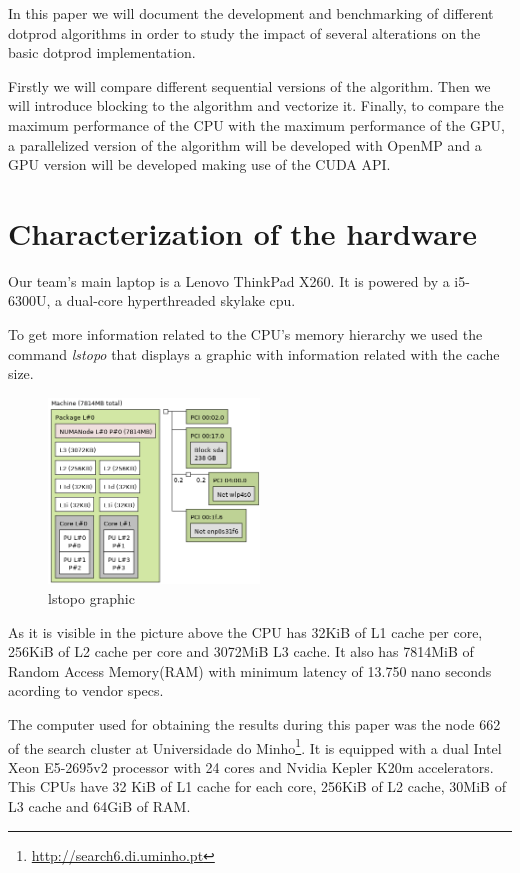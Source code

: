 \documentclass[a4paper]{report}
\begin{document}
In this paper we will document the development and benchmarking of different
dotprod algorithms in order to study the impact of several alterations on the
basic dotprod implementation.

Firstly we will compare different sequential versions of the algorithm. Then we
will introduce blocking to the algorithm and vectorize it. Finally, to compare
the maximum performance of the CPU with the maximum performance of the GPU, a
parallelized version of the algorithm will be developed with OpenMP and a GPU
version will be developed making use of the CUDA API.

\chapter{Characterization of the hardware}
Our team's main laptop is a Lenovo ThinkPad X260. It is powered by a i5-6300U, a
dual-core hyperthreaded skylake cpu.

To get more information related to the CPU's memory hierarchy we used the
command \textit{lstopo} that displays a graphic with information related with
the cache size.
\begin{figure}[H]
    \centering
        \includegraphics[width=0.5\textwidth]{images/lstopo.png}
        \caption{lstopo graphic}
\end{figure}

As it is visible in the picture above the CPU has 32KiB of L1 cache per core,
256KiB of L2 cache per core and 3072MiB L3 cache. It also has 7814MiB of Random
Access Memory(RAM) with minimum latency of 13.750 nano seconds acording to
vendor specs.

The computer used for obtaining the results during this paper was the node 662
of the search cluster at Universidade do
Minho\footnote[1]{\url{http://search6.di.uminho.pt}}. It is equipped with
a
dual Intel Xeon E5-2695v2 processor
with 24 cores and Nvidia Kepler K20m accelerators. This CPUs have 32 KiB of L1
cache for each core, 256KiB of L2 cache, 30MiB of L3 cache and 64GiB of RAM.
\end{document}

